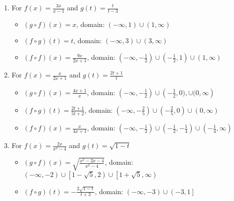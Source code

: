 \begin{enumerate}
\begin{itemize}
\end{itemize}


\item For   $f(x) = \frac{3x}{x-1}$ and $g(t) =\frac{t}{t-3}$

\begin{itemize}

\item  $(g \circ f)(x) =x$, domain: $\left(-\infty, 1\right) \cup (1, \infty)$

\item  $(f \circ g)(t) =t$, domain:  $\left(-\infty, 3\right) \cup (3,\infty)$

\item  $(f \circ f)(x) = \frac{9x}{2x+1}$, domain: $\left(-\infty, -\frac{1}{2}\right) \cup \left(-\frac{1}{2}, 1 \right) \cup \left(1,\infty \right)$

\end{itemize}


\item For    $f(x) = \frac{x}{2x+1}$ and $g(t) = \frac{2t+1}{t}$

\begin{itemize}

\item  $(g \circ f)(x) = \frac{4x+1}{x}$, domain: $\left(-\infty, -\frac{1}{2}\right) \cup \left(-\frac{1}{2}, 0), \cup (0, \infty\right)$

\item  $(f \circ g)(t) = \frac{2t+1}{5t+2}$, domain:  $\left(-\infty, -\frac{2}{5}\right) \cup \left(-\frac{2}{5}, 0\right) \cup (0,\infty)$

\item  $(f \circ f)(x) = \frac{x}{4x+1}$, domain: $\left(-\infty, -\frac{1}{2}\right) \cup \left(-\frac{1}{2}, -\frac{1}{4} \right) \cup \left(-\frac{1}{4},\infty\right)$

\end{itemize}




\item For  $f(x) = \frac{2x}{x^2-4}$ and $g(t) =\sqrt{1-t}$ 

\begin{itemize}

\item  $(g \circ f)(x) =\sqrt{\frac{x^2-2x-4}{x^2-4}}$, domain: $\left(-\infty, -2\right) \cup \left[1-\sqrt{5}, 2\right) \cup \left[1+\sqrt{5}, \infty\right)$

\item  $(f \circ g)(t) = -\frac{2\sqrt{1-t}}{t+3}$, domain: $\left(-\infty, -3\right) \cup \left(-3, 1\right]$


\end{itemize}
\end{enumerate}
